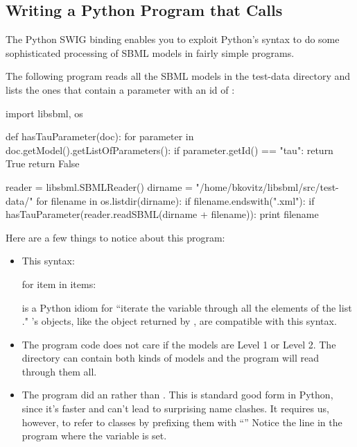 \documentclass{sbmlmanual}
\begin{document}
\subsection{Writing a Python Program that Calls \libsbml{}}
\label{sec:python-calling-libsbml}

The Python SWIG binding enables you to exploit Python's
syntax to do some sophisticated processing of SBML models in
fairly simple programs.

The following program reads all the SBML models in the
test-data directory and lists the ones that contain a
parameter with an id of :

\begin{boxedCodeVerbatim}
import libsbml, os

def hasTauParameter(doc):
   for parameter in doc.getModel().getListOfParameters():
      if parameter.getId() == "tau":
         return True
   return False

reader = libsbml.SBMLReader()
dirname = "/home/bkovitz/libsbml/src/test-data/"
for filename in os.listdir(dirname):
   if filename.endswith(".xml"):
      if hasTauParameter(reader.readSBML(dirname + filename)):
         print filename
\end{boxedCodeVerbatim}

Here are a few things to notice about this program:

\begin{itemize}

\item
This syntax:

\begin{shellVerbatim}
for item in items:
\end{shellVerbatim}

is a Python idiom for ``iterate the variable  through
all the elements of the list ."  \libsbml{}'s 
objects, like the object returned by
, are compatible with this
syntax.

\item
The program code does not care if the models are Level 1 or Level 2.  The
directory can contain both kinds of models and the program will read through
them all.

\item
The program did an  rather than
.  This is standard good form in Python, since
it's faster and can't lead to surprising name clashes.  It requires us,
however, to refer to \libsbml{} classes by prefixing them with
``''  Notice the line in the program where the variable
 is set.

\end{itemize}
\end{document}
